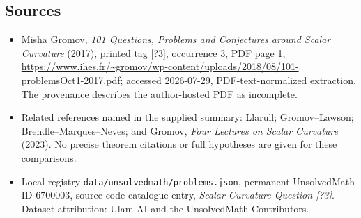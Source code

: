 \documentclass[11pt]{article}
\begin{document}
\subsection{Sources}
\begin{itemize}
\item Misha Gromov, \emph{101 Questions, Problems and Conjectures around Scalar Curvature} (2017), printed tag [?3], occurrence 3, PDF page 1, \url{https://www.ihes.fr/~gromov/wp-content/uploads/2018/08/101-problemsOct1-2017.pdf}; accessed 2026-07-29, PDF-text-normalized extraction. The provenance describes the author-hosted PDF as incomplete.
\item Related references named in the supplied summary: Llarull; Gromov--Lawson; Brendle--Marques--Neves; and Gromov, \emph{Four Lectures on Scalar Curvature} (2023). No precise theorem citations or full hypotheses are given for these comparisons.
\item Local registry \texttt{data/unsolvedmath/problems.json}, permanent UnsolvedMath ID $6700003$, source code catalogue entry, \emph{Scalar Curvature Question [?3]}. Dataset attribution: Ulam AI and the UnsolvedMath Contributors.
\end{itemize}
\end{document}

